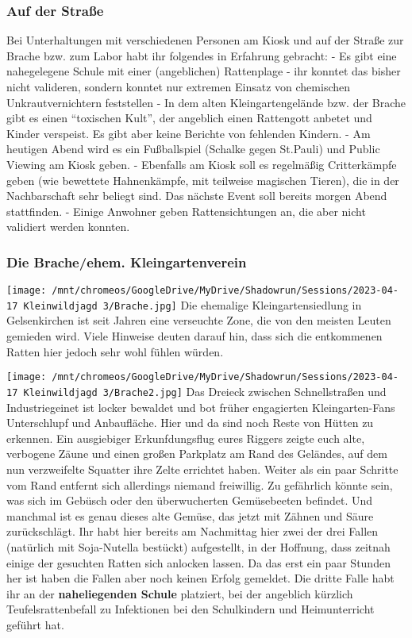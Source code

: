 \documentclass{ShadowTeXSR5}
\begin{document}
\hypertarget{auf-der-strauxdfe}{%
\subsubsection{Auf der Straße}\label{auf-der-strauxdfe}}
Bei Unterhaltungen mit verschiedenen Personen am Kiosk und auf der Straße zur Brache bzw. zum Labor habt ihr folgendes in Erfahrung gebracht: - Es gibt eine nahegelegene Schule mit einer (angeblichen) Rattenplage - ihr konntet das bisher nicht valideren, sondern konntet nur extremen Einsatz von chemischen Unkrautvernichtern feststellen - In dem alten Kleingartengelände bzw. der Brache gibt es einen ``toxischen Kult'', der angeblich einen Rattengott anbetet und Kinder verspeist. Es gibt aber keine Berichte von fehlenden Kindern. - Am heutigen Abend wird es ein Fußballspiel (Schalke gegen St.Pauli) und Public Viewing am Kiosk geben. - Ebenfalls am Kiosk soll es regelmäßig Critterkämpfe geben (wie bewettete Hahnenkämpfe, mit teilweise magischen Tieren), die in der Nachbarschaft sehr beliegt sind. Das nächste Event soll bereits morgen Abend stattfinden. - Einige Anwohner geben Rattensichtungen an, die aber nicht validiert werden konnten.

\hypertarget{die-bracheehem.-kleingartenverein}{%
\subsubsection{Die Brache/ehem. Kleingartenverein}\label{die-bracheehem.-kleingartenverein}}
\texttt{[image: /mnt/chromeos/GoogleDrive/MyDrive/Shadowrun/Sessions/2023-04-17 Kleinwildjagd 3/Brache.jpg]}
Die ehemalige Kleingartensiedlung in Gelsenkirchen ist seit Jahren eine verseuchte Zone, die von den meisten Leuten gemieden wird. Viele Hinweise deuten darauf hin, dass sich die entkommenen Ratten hier jedoch sehr wohl fühlen würden.

\texttt{[image: /mnt/chromeos/GoogleDrive/MyDrive/Shadowrun/Sessions/2023-04-17 Kleinwildjagd 3/Brache2.jpg]}
Das Dreieck zwischen Schnellstraßen und Industriegeinet ist locker bewaldet und bot früher engagierten Kleingarten-Fans Unterschlupf und Anbaufläche. Hier und da sind noch Reste von Hütten zu erkennen. Ein ausgiebiger Erkunfdungsflug eures Riggers zeigte euch alte, verbogene Zäune und einen großen Parkplatz am Rand des Geländes, auf dem nun verzweifelte Squatter ihre Zelte errichtet haben. Weiter als ein paar Schritte vom Rand entfernt sich allerdings niemand freiwillig. Zu gefährlich könnte sein, was sich im Gebüsch oder den überwucherten Gemüsebeeten befindet. Und manchmal ist es genau dieses alte Gemüse, das jetzt mit Zähnen und Säure zurückschlägt.
Ihr habt hier bereits am Nachmittag hier zwei der drei Fallen (natürlich mit Soja-Nutella bestückt) aufgestellt, in der Hoffnung, dass zeitnah einige der gesuchten Ratten sich anlocken lassen. Da das erst ein paar Stunden her ist haben die Fallen aber noch keinen Erfolg gemeldet. Die dritte Falle habt ihr an der \textbf{naheliegenden Schule} platziert, bei der angeblich kürzlich Teufelsrattenbefall zu Infektionen bei den Schulkindern und Heimunterricht geführt hat.
\end{document}
